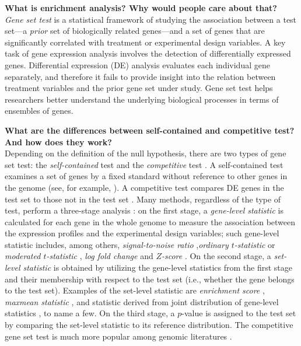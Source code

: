 \documentclass[useAMS,usenatbib, galley]{biom}
\begin{document}
	\textbf{What is enrichment analysis? Why would people care about that?}\\
	\textit{Gene set test} is a statistical framework of studying the association between a test set---a \textit{prior} set of biologically related genes---and a set of genes that are significantly correlated with treatment or experimental design variables. A key task of gene expression analysis involves the detection of differentially expressed genes. Differential expression (DE) analysis  evaluates each individual gene separately, and therefore it fails to provide insight into the relation between treatment variables and the prior gene set under study. Gene set test helps researchers better understand the underlying biological processes in terms of ensembles of genes.
	
	\textbf{What are the differences between self-contained and competitive test? And how does they work?}\\
	Depending on the definition of the null hypothesis, there are two types of gene set test: the \textit{self-contained} test and the \textit{competitive} test \citep{goeman2007analyzing}. A self-contained test examines a set of genes by a fixed standard without reference to other genes in the genome (see, for example, \cite{goeman2004global,goeman2005testing, tsai2009multivariate, wu2010roast, huang2013gene}). A competitive test compares DE
	genes in the test set to those not in the test set \citep{tian2005discovering, wu2012camera, yaari2013quantitative}. Many methods, regardless of the type of test, perform a three-stage analysis \citep{khatri2012ten}: on the first stage, a \textit{gene-level statistic} is calculated for each gene in the whole genome to measure the association between the expression profiles and the experimental design variables; such gene-level statistic includes, among others, \textit{signal-to-noise ratio} \citep{subramanian2005gene},\textit{ordinary $t$-statistic} \citep{tian2005discovering} or \textit{moderated $t$-statistic} \citep{Smyth2004moderated}, \textit{log fold change} \citep{kim2005page} and \textit{$Z$-score} \citep{efron2007correlation}. On the second stage, a \textit{set-level statistic} is obtained by utilizing the gene-level statistics from the first stage and their membership with respect to the test set (i.e., whether the gene belongs to the test set). Examples of the set-level statistic are \textit{enrichment score} \citep{subramanian2005gene}, \textit{maxmean statistic} \citep{efron2007testing}, and statistic derived from joint distribution of gene-level statistics \citep{yaari2013quantitative}, to name a few. On the third stage, a $p$-value is assigned to the test set by comparing the set-level statistic to its reference distribution. The competitive gene set test is much more popular among genomic literatures \citep{goeman2007analyzing, gatti2010heading}.  
	
\end{document}
